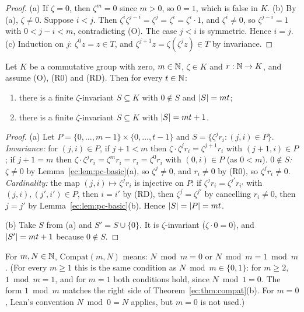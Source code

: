 \begin{proof}
(a) If $\zeta=0$, then $\zeta^m=0$ since $m>0$, so $0=1$, which is false in $K$.
(b) By (a), $\zeta\ne0$. Suppose $i<j$. Then $\zeta^i\zeta^{j-i}=\zeta^j=\zeta^i=\zeta^i\cdot1$, and $\zeta^i\ne0$, so
$\zeta^{j-i}=1$ with $0<j-i<m$, contradicting (O). The case $j<i$ is symmetric. Hence $i=j$.
(c) Induction on $j$: $\zeta^0z=z\in T$, and $\zeta^{j+1}z=\zeta(\zeta^jz)\in T$ by invariance.
\end{proof}

\begin{lemma}\label{ec:lem:pc-exist}
Let $K$ be a commutative group with zero, $m\in\mathbb N$, $\zeta\in K$ and $r:\mathbb N\to K$, and assume \textup{(O)},
\textup{(R0)} and \textup{(RD)}. Then for every $t\in\mathbb N$:
\begin{enumerate}[label=(\alph*)]
\item there is a finite $\zeta$-invariant $S\subseteq K$ with $0\notin S$ and $\lvert S\rvert=mt$;
\item there is a finite $\zeta$-invariant $S\subseteq K$ with $\lvert S\rvert=mt+1$.
\end{enumerate}
\end{lemma}

\begin{proof}
(a) Let $P=\{0,\dots,m-1\}\times\{0,\dots,t-1\}$ and $S=\{\zeta^jr_i:(j,i)\in P\}$. \emph{Invariance:} for $(j,i)\in
P$, if $j+1<m$ then $\zeta\cdot\zeta^jr_i=\zeta^{j+1}r_i$ with $(j+1,i)\in P$; if $j+1=m$ then
$\zeta\cdot\zeta^jr_i=\zeta^mr_i=r_i=\zeta^0r_i$ with $(0,i)\in P$ (as $0<m$). \emph{$0\notin S$:} $\zeta\ne0$ by
Lemma~\ref{ec:lem:pc-basic}(a), so $\zeta^j\ne0$, and $r_i\ne0$ by (R0), so $\zeta^jr_i\ne0$. \emph{Cardinality:} the
map $(j,i)\mapsto\zeta^jr_i$ is injective on $P$: if $\zeta^jr_i=\zeta^{j'}r_{i'}$ with $(j,i),(j',i')\in P$, then
$i=i'$ by (RD), then $\zeta^j=\zeta^{j'}$ by cancelling $r_i\ne0$, then $j=j'$ by Lemma~\ref{ec:lem:pc-basic}(b). Hence
$\lvert S\rvert=\lvert P\rvert=mt$.

(b) Take $S$ from (a) and $S'=S\cup\{0\}$. It is $\zeta$-invariant ($\zeta\cdot0=0$), and $\lvert S'\rvert=mt+1$ because
$0\notin S$.
\end{proof}

\begin{definition}\label{ec:def:compat}
For $m,N\in\mathbb N$, $\mathrm{Compat}(m,N)$ means: $N\bmod m=0$ or $N\bmod m=1\bmod m$. (For every $m\ge1$ this is the
same condition as $N\bmod m\in\{0,1\}$: for $m\ge2$, $1\bmod m=1$, and for $m=1$ both conditions hold, since
$N\bmod1=0$. The form $1\bmod m$ matches the right side of Theorem~\ref{ec:thm:compat}(b). For $m=0$, Lean's
convention $N\bmod0=N$ applies, but $m=0$ is not used.)
\end{definition}

